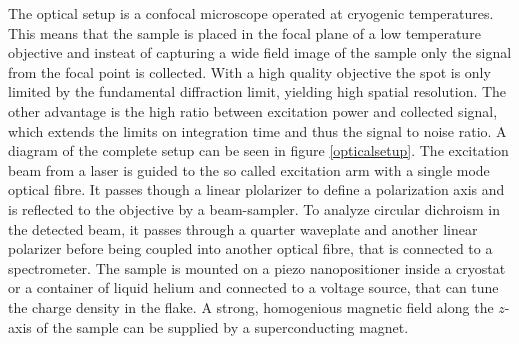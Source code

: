 The optical setup is a confocal microscope operated at cryogenic temperatures. This means that the sample is placed in the focal plane of a low temperature objective and insteat of capturing a wide field image of the sample only the signal from the focal point is collected. With a high quality objective the spot is only limited by the fundamental diffraction limit, yielding high spatial resolution. The other advantage is the high ratio between excitation power and collected signal, which extends the limits on integration time and thus the signal to noise ratio. A diagram of the complete setup can be seen in figure \ref{opticalsetup}. The excitation beam from a laser is guided to the so called excitation arm with a single mode optical fibre. It passes though a linear plolarizer to define a polarization axis and is reflected to the objective by a beam-sampler. To analyze circular dichroism in the detected beam, it passes through a quarter waveplate and another linear polarizer before being coupled into another optical fibre, that is connected to a spectrometer. The sample is mounted on a piezo nanopositioner inside a cryostat or a container of liquid helium and connected to a voltage source, that can tune the charge density in the \tmdg flake. A strong, homogenious magnetic field along the $z$-axis of the sample can be supplied by a superconducting magnet.

